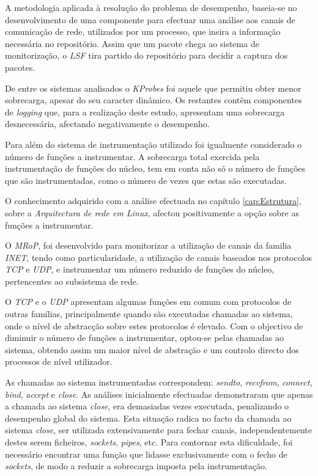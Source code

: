 
%
%


A metodologia aplicada à resolução do problema de desempenho, baseia-se no desenvolvimento de uma componente para efectuar uma análise aos canais de comunicação de rede, utilizados por um processo, que insira a informação necessária no repositório.
Assim que um pacote chega ao sistema de monitorização, o \textit{LSF} tira partido do repositório para decidir a captura dos pacotes.


De entre os sistemas analisados o \textit{KProbes} foi aquele que permitiu obter menor sobrecarga, apesar do seu caracter dinâmico.
Os restantes contêm componentes de \textit{logging} que, para a realização deste estudo, apresentam uma sobrecarga desnecessária, afectando negativamente o desempenho.

Para além do sistema de instrumentação utilizado foi igualmente considerado o número de funções a instrumentar.
A sobrecarga total exercida pela instrumentação de funções do núcleo, tem em conta não só o número de funções que são instrumentadas, como o número de vezes que estas são executadas.

O conhecimento adquirido com a análise efectuada no capítulo \ref{cap:Estrutura}, sobre a \textit{Arquitectura de rede em Linux}, afectou positivamente a opção sobre as funções a instrumentar.

O \textit{MRoP}, foi desenvolvido para monitorizar a utilização de canais da familia \textit{INET}, tendo como particularidade, a utilização de canais baseados nos protocolos \textit{TCP} e \textit{UDP}, e instrumentar um número reduzido de funções do núcleo, pertencentes ao subsistema de rede.

O \textit{TCP} e o \textit{UDP} apresentam algumas funções em comum com protocolos de outras famílias, principalmente quando são executadas chamadas ao sistema, onde o nível de abstracção sobre estes protocolos é elevado.
Com o objectivo de diminuir o número de funções a instrumentar, optou-se pelas chamadas ao sistema, obtendo assim um maior nível de abstração e um controlo directo dos processos de nível utilizador.

As chamadas ao sistema instrumentadas correspondem: \textit{sendto}, \textit{recvfrom}, \textit{connect}, \textit{bind}, \textit{accept} e \textit{close}.
As análises inicialmente efectuadas demonstraram que apenas a chamada ao sistema \textit{close}, era demasiadas vezes executada, penalizando o desempenho global do sistema.
Esta situação radica no facto da chamada ao sistema \textit{close}, ser utilizada extensivamente para fechar canais, independentemente destes serem ficheiros, \textit{sockets}, \textit{pipes}, etc.
Para contornar esta dificuldade, foi necessário encontrar uma função que lidasse exclusivamente com o fecho de \textit{sockets}, de modo a reduzir a sobrecarga imposta pela instrumentação.


